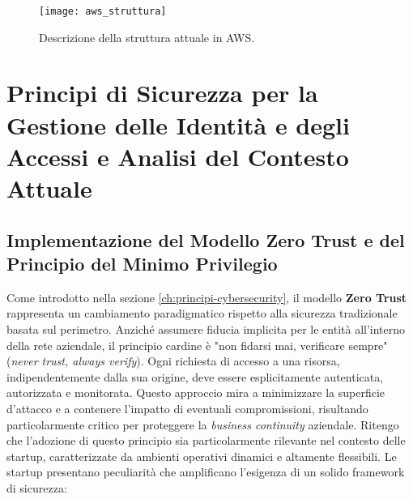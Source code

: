 \begin{figure}[h] %
  \centering
  \texttt{[image: aws\_struttura]} %
  \caption{Descrizione della struttura attuale in AWS.} %
  \label{fig:aws_struttura_attuale} %
\end{figure}

\section{Principi di Sicurezza per la Gestione delle Identità e degli Accessi e Analisi del Contesto Attuale}
\label{sec:principi-identita-accessi}
\subsection{Implementazione del Modello Zero Trust e del Principio del Minimo Privilegio}
\label{sec:zero-trust-implementation}

Come introdotto nella sezione \ref{ch:principi-cybersecurity}, il modello \textbf{Zero Trust} rappresenta un cambiamento paradigmatico rispetto alla sicurezza tradizionale basata sul perimetro. Anziché assumere fiducia implicita per le entità all'interno della rete aziendale, il principio cardine è "non fidarsi mai, verificare sempre" (\textit{never trust, always verify}). Ogni richiesta di accesso a una risorsa, indipendentemente dalla sua origine, deve essere esplicitamente autenticata, autorizzata e monitorata. Questo approccio mira a minimizzare la superficie d'attacco e a contenere l'impatto di eventuali compromissioni, risultando particolarmente critico per proteggere la \textit{business continuity} aziendale. Ritengo che l'adozione di questo principio sia particolarmente rilevante nel contesto delle startup, caratterizzate da ambienti operativi dinamici e altamente flessibili. Le startup presentano peculiarità che amplificano l'esigenza di un solido framework di sicurezza:

